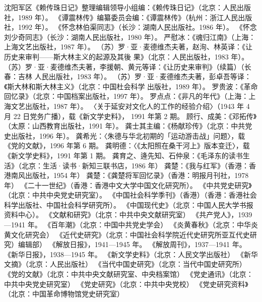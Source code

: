 \begin{thebibliography}{999}
\bibitem{} 沈阳军区《赖传珠日记》整理编辑领导小组编：《赖传珠日记》（北京：人民出版社，1989 年）。
\bibitem{} 《谭震林传》编纂委员会编：《谭震林传》（杭州：浙江人民出版社，1992 年）。
\bibitem{} 《怀念林伯渠同志》（长沙：湖南人民出版社。1986 年）。
\bibitem{} 《怀念刘少奇同志》（长沙：湖南人民出版社，1980 年）。
\bibitem{} 严慰冰：《魂归江南》（上海：上海文艺出版社，1987 年）。
\bibitem{} （苏）罗·亚·麦德维杰夫著，赵洵、林英译：《让历史来审判——斯大林主义的起源及其後 果》（北京：人民出版社，1983 年）。
\bibitem{} （苏）罗·亚·麦德维杰夫著，李援朝、黄元等译：《让历史来审判》（续篇）（长春：吉林 人民出版社，1983 年）。
\bibitem{} （苏）罗·亚·麦德维杰夫著，彭卓吾等译：《斯大林和斯大林主义》（北京：中国杜会科学 出版社，1989 年）。
\bibitem{} 罗贵波：《革命回忆录》（北京：中国档案出版社，1997 年）。
\bibitem{} 罗点点：《非凡的年代》（上海：上海文艺出版社，1987 年）。
\bibitem{} 〈关于延安对文化人的工作的经验介绍〉（1943 年 4 月 22 日党务广播），载《新文学史料》， 1991 年第 2 期。
\bibitem{} 顾行、成美：《邓拓传》（太原：山西教育出版社，1991 年）。
\bibitem{} 龚士其主编：《杨献珍传》（北京：中共党史出版社，1996 年）。
\bibitem{} 龚希光：〈朱德与华北初期的「运动游击战」问题〉，载《党的文献》，1996 年第 6 期。
\bibitem{} 龚明德：〈《太阳照在桑干河上》版本变迁〉，载《新文学史料》，1991 年第 1 期。
\bibitem{} 龚育之、逄先知、石仲泉：《毛泽东的读书生活》（北京：生活·读书·新知三联书店，1986 年）
\bibitem{} 龚楚：《我与红军》（香港：香港南风出版社，1954 年）
\bibitem{} 龚楚：《龚楚将军回忆录》（香港：明报月刊社，1978 年）
\bibitem{} 《二十一世纪》（香港：香港中文大学中国文化研究所）。
\bibitem{} 《中共党史研究》（北京：中共中央党史研究室）。
\bibitem{} 《中国社会科学季刊》（香港）（香港：香港社会科学出版社、中国社会科学研究所）。
\bibitem{} 《中国现代史》（北京：中国人民大学书报资料中心）。
\bibitem{} 《文献和研究》（北京：中共中央文献研究室）
\bibitem{} 《共产党人》，1939—1941 年。
\bibitem{} 《百年潮》（北京：中国中共党史学会）
\bibitem{} 《炎黄春秋》（北京：中华炎黄文化研究会）
\bibitem{} 《近代史研究》（北京：中国社会科学院近代史研究所亚互代史研究）编辑部）
\bibitem{} 《解放日报》，1941—1945 年。
\bibitem{} 《解放周刊》，1937—1941 年。
\bibitem{} 《新华日报》，1938—1945 年。
\bibitem{} 《新文学史料》（北京：人民文学出版社）
\bibitem{} 《新华文摘》（北京：人民出版社）
\bibitem{} 《当代中国史研究》（北京：当代中国史研究所）
\bibitem{} 《党的文献》（北京：中共中央文献研究室、中央档案馆）
\bibitem{} 《党史通讯》（北京：中共中央党史研究室）
\bibitem{} 《党史研究》（北京：中共中央党校）
\bibitem{} 《党史研究资料》（北京：中国革命博物馆党史研究室）
\end{thebibliography}
